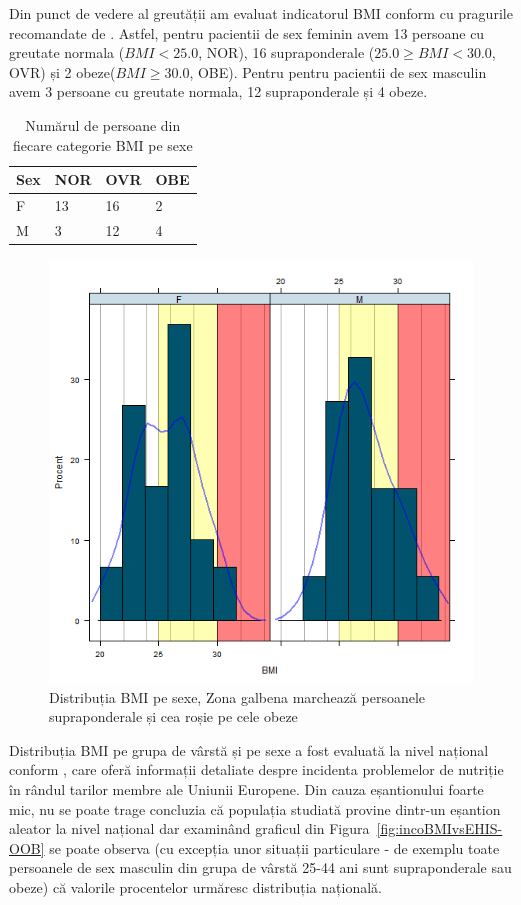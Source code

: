 \documentclass[11pt,draft]{article}
\begin{document}
  Din punct de vedere al greutății am evaluat indicatorul \ac{BMI} conform cu pragurile recomandate de \citep{whobmi06}. 
  Astfel, pentru pacientii de sex feminin avem 13 persoane cu greutate normala ($BMI<25.0$, NOR), 16 supraponderale ($25.0 \geq BMI <30.0$, OVR) și 2 obeze($BMI \geq 30.0$, OBE). 
  Pentru pentru pacientii de sex masculin avem 3 persoane cu greutate normala, 12 supraponderale și 4 obeze.   
  \begin{table}[H]
   \centering
   \begin{tabular}{ |l|l|l|l| }
    \hline
    Sex & NOR & OVR & OBE \\ \hline
    F & 13 & 16 & 2 \\ \hline
    M & 3 &  12 & 4 \\ \hline
   \end{tabular}
   \caption{Numărul de persoane din fiecare categorie \ac{BMI} pe sexe}
   \label{tab:BMIgSex}
  \end{table}
  \begin{figure}[H]
    \centering
    \includegraphics[width=0.8\linewidth]{incobmiDens}
    \caption{Distribuția \ac{BMI} pe sexe, Zona galbena marchează persoanele supraponderale și cea roșie pe cele obeze}
    \label{fig:incobmiDens}
  \end{figure}
  Distribuția \ac{BMI} pe grupa de vârstă și pe sexe a fost evaluată la nivel național conform \citep{EHIS09}, care oferă informații detaliate despre incidenta problemelor de nutriție în rândul tarilor membre ale Uniunii Europene. 
  Din cauza eșantionului foarte mic, nu se poate trage concluzia că populația studiată provine dintr-un eșantion aleator la nivel național dar examinând graficul din Figura~\ref{fig:incoBMIvsEHIS-OOB} se poate observa (cu excepția unor situații particulare - de exemplu toate persoanele de sex masculin din grupa de vârstă 25-44 ani sunt supraponderale sau obeze) că valorile procentelor urmăresc distribuția națională.
\end{document}
